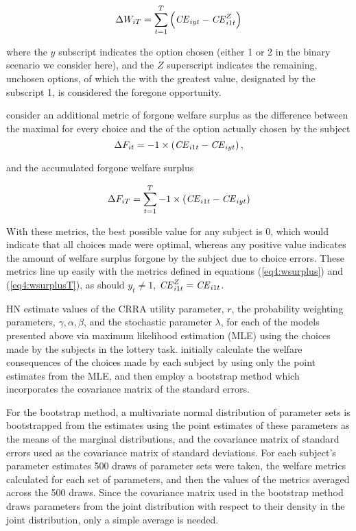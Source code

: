 \documentclass[../main.tex]{subfiles}
\begin{document}
\begin{equation}
	\label{eq4:wsurplusT}
	\Delta W_{iT} = \sum_{t=1}^T \left( {\mathit{CE}}_{iyt} - {\mathit{CE}}_{i1t}^Z \right)
\end{equation}

\noindent where the $y$ subscript indicates the option chosen (either 1 or 2 in the binary scenario we consider here), and the $Z$ superscript indicates the remaining, unchosen options, of which the {\CE} with the greatest value, designated by the subscript 1, is considered the foregone opportunity.

\textcite[106]{Harrison2016} consider an additional metric of forgone welfare surplus as the difference between the maximal {\CE} for every choice and the {\CE} of the option actually chosen by the subject
\begin{equation}
	\label{eq4:wforgone}
	\Delta F_{it} = -1 \times \left( {\mathit{CE}}_{i1t} - {\mathit{CE}}_{iyt} \right) , 
\end{equation}

\noindent and the accumulated forgone welfare surplus

\begin{equation}
	\label{eq4:wforgoneT}
	\Delta F_{iT} = \sum_{t=1}^T  -1 \times \left( {\mathit{CE}}_{i1t} - {\mathit{CE}}_{iyt} \right)
\end{equation}

\noindent With these metrics, the best possible value for any subject is 0, which would indicate that all choices made were optimal, whereas any positive value indicates the amount of welfare surplus forgone by the subject due to choice errors.
These metrics line up easily with the metrics defined in equations (\ref{eq4:wsurplus}) and (\ref{eq4:wsurplusT}), as should $y_t \neq 1$, ${\mathit{CE}}_{i1t}^Z = {\mathit{CE}}_{i1t}$.

HN estimate values of the CRRA utility parameter, $r$, the probability weighting parameters, $\gamma, \alpha, \beta$, and the stochastic parameter $\lambda$, for each of the models presented above via maximum likelihood estimation (MLE) using the choices made by the subjects in the lottery task.
\textcite[107,110]{Harrison2016} initially calculate the welfare consequences of the choices made by each subject by using only the point estimates from the MLE, and then employ a bootstrap method which incorporates the covariance matrix of the standard errors.

For the bootstrap method, a multivariate normal distribution of parameter sets is bootstrapped from the estimates using the point estimates of these parameters as the means of the marginal distributions, and the covariance matrix of standard errors used as the covariance matrix of standard deviations.
For each subject's parameter estimates 500 draws of parameter sets were taken, the welfare metrics calculated for each set of parameters, and then the values of the metrics averaged across the 500 draws.
Since the covariance matrix used in the bootstrap method draws parameters from the joint distribution with respect to their density in the joint distribution, only a simple average is needed.
\end{document}
